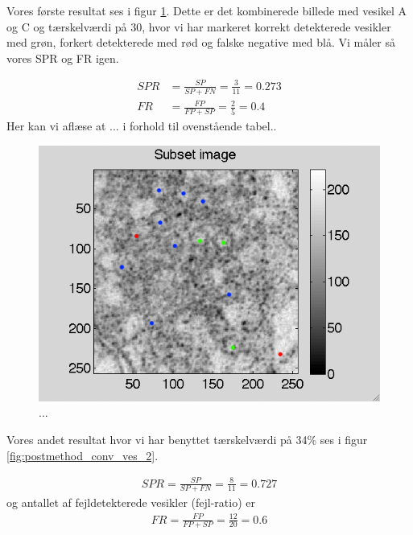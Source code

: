 Vores første resultat ses i figur \ref{fig:postmethod_conv_ves_1}. Dette er det kombinerede billede med vesikel A og C og tærskelværdi på 30, hvor vi har markeret korrekt detekterede vesikler med grøn, forkert detekterede med rød og falske negative med blå. Vi måler så vores SPR og FR igen.

\begin{align}
	SPR &= \frac{SP}{SP+FN} = \frac{3}{11} = 0.273\\
	FR &= \frac{FP}{FP+SP} = \frac{2}{5} = 0.4
\end{align}
Her kan vi aflæse at ... i forhold til ovenstående tabel..

\begin{figure}[H]
		\centering
		\includegraphics[scale=0.9]{files/postmethod/img/ves1+2_th-30_res.png}
	\caption{...\label{fig:postmethod_conv_ves_1}}
\end{figure}

Vores andet resultat hvor vi har benyttet tærskelværdi på 34\% ses i figur \ref{fig:postmethod_conv_ves_2}. 

\begin{align}
	SPR = \frac{SP}{SP+FN} = \frac{8}{11} = 0.727
\end{align}
og antallet af fejldetekterede vesikler (fejl-ratio) er
\begin{align}
	FR = \frac{FP}{FP+SP} = \frac{12}{20} = 0.6
\end{align}

